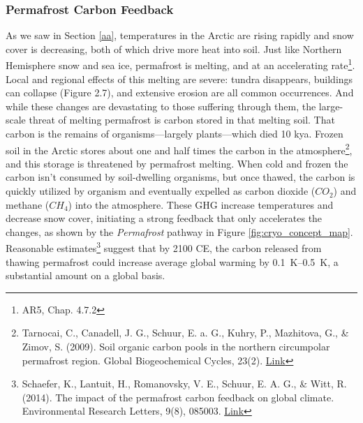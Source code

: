 \subsubsection{Permafrost Carbon Feedback} As we saw in Section \ref{aa}, temperatures in the Arctic are rising rapidly and snow cover is decreasing, both of which drive more heat into soil. Just like Northern Hemisphere snow and sea ice, permafrost is melting, and at an accelerating rate\footnote{AR5, Chap. 4.7.2}. Local and regional effects of this melting are severe: tundra disappears, buildings can collapse (Figure 2.7), and extensive erosion are all common occurrences. And while these changes are devastating to those suffering through them, the large-scale threat of melting permafrost is carbon stored in that melting soil. That carbon is the remains of organisms---largely plants---which died 10 kya. Frozen soil in the Arctic stores about one and half times the carbon in the atmosphere\footnote{Tarnocai, C., Canadell, J. G., Schuur, E. a. G., Kuhry, P., Mazhitova, G., \& Zimov, S. (2009). Soil organic carbon pools in the northern circumpolar permafrost region. Global Biogeochemical Cycles, 23(2). \href{https://doi.org/10.1029/2008GB003327}{Link}}, and this storage is threatened by permafrost melting. When cold and frozen the carbon isn't consumed by soil-dwelling organisms, but once thawed, the carbon is quickly utilized by organism and eventually expelled as carbon dioxide ($CO_2$) and methane ($CH_4$) into the atmosphere. These GHG increase temperatures and decrease snow cover, initiating a strong feedback that only accelerates the changes, as shown by the \textit{Permafrost} pathway in Figure \ref{fig:cryo_concept_map}. Reasonable estimates\footnote{Schaefer, K., Lantuit, H., Romanovsky, V. E., Schuur, E. A. G., \& Witt, R. (2014). The impact of the permafrost carbon feedback on global climate. Environmental Research Letters, 9(8), 085003. \href{https://doi.org/10.1088/1748-9326/9/8/085003}{Link}} suggest that by 2100 CE, the carbon released from thawing permafrost could increase average global warming by \SIrange{0.1}{0.5}{\kelvin}, a substantial amount on a global basis.\\
 
